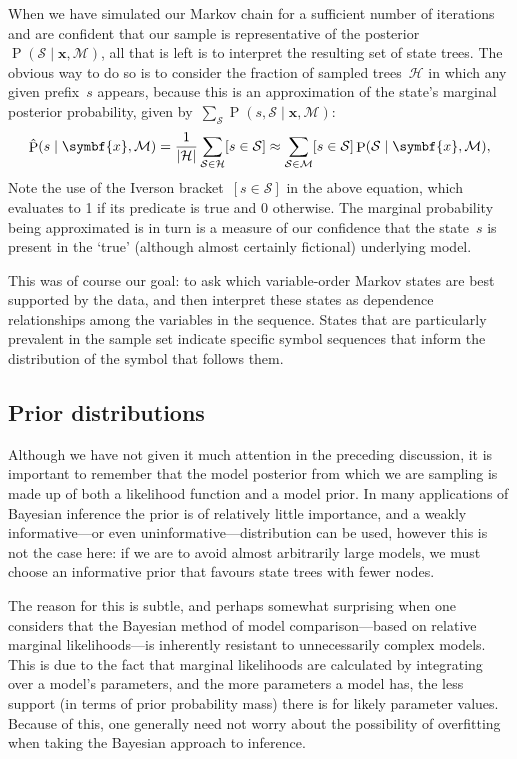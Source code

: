 \documentclass[11pt,a4paper]{article}
\newcommand\mc[1]{\mathcal{#1}}               %
\newcommand\ub[1]{\symbf{#1}}                 %
\DeclareMathOperator\Pb{P}                    %
\DeclarePairedDelimiter\abs{\lvert}{\rvert}   %
\begin{document}
When we have simulated our Markov chain for a sufficient number of iterations
and are confident that our sample is representative of the
posterior~\(\Pb(\mc{S} \mid \ub{x}, \mc{M})\), all that is left is to interpret
the resulting set of state trees. The obvious way to do so is to consider the
fraction of sampled trees~\(\mc{H}\) in which any given prefix~\(s\) appears,
because this is an approximation of the state's marginal posterior probability,
given by~\(\sum_{\mc{S}} \Pb(s, \mc{S} \mid \ub{x}, \mc{M})\):
\begin{equation}\label{eqn:marginal}
  \hat{\Pb}(s \mid \ub{x}, \mc{M}) =
      \frac{1}{\abs{\mc{H}}} \sum_{\mc{S}\in\mc{H}} [s \in \mc{S}]
    \approx \sum_{\mc{S}\in\mc{M}} [s \in \mc{S}]
      \Pb(\mc{S} \mid \ub{x}, \mc{M}),
\end{equation}
Note the use of the Iverson bracket~\([s \in \mc{S}]\) in the above equation,
which evaluates to 1 if its predicate is true and 0 otherwise. The marginal
probability being approximated is in turn is a measure of our confidence that
the state~\(s\) is present in the `true' (although almost certainly fictional)
underlying model.

This was of course our goal: to ask which variable-order Markov states are best
supported by the data, and then interpret these states as dependence
relationships among the variables in the sequence. States that are particularly
prevalent in the sample set indicate specific symbol sequences that inform the
distribution of the symbol that follows them.

\subsection{Prior distributions} %

Although we have not given it much attention in the preceding discussion, it is
important to remember that the model posterior from which we are sampling is
made up of both a likelihood function and a model prior. In many applications of
Bayesian inference the prior is of relatively little importance, and a weakly
informative---or even uninformative---distribution can be used, however this is
not the case here: if we are to avoid almost arbitrarily large models, we must
choose an informative prior that favours state trees with fewer nodes.

The reason for this is subtle, and perhaps somewhat surprising when one
considers that the Bayesian method of model comparison---based on relative
marginal likelihoods---is inherently resistant to unnecessarily complex models.
This is due to the fact that marginal likelihoods are calculated by integrating
over a model's parameters, and the more parameters a model has, the less support
(in terms of prior probability mass) there is for likely parameter values.
Because of this, one generally need not worry about the possibility of
overfitting when taking the Bayesian approach to inference.
\end{document}
